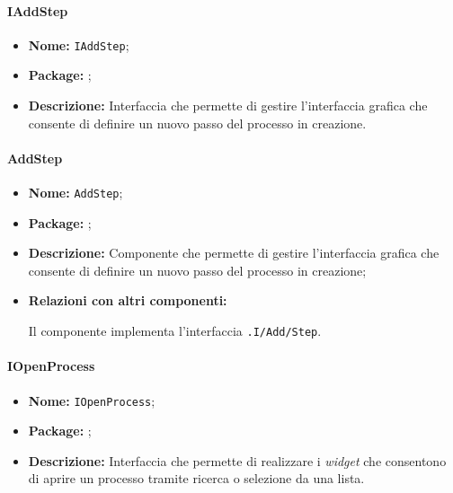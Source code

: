 \paragraph{IAddStep}
\begin{itemize}
\item \textbf{Nome:} \texttt{IAddStep};
\item \textbf{Package:} \texttt{\viewAdmin{}};
\item \textbf{Descrizione:} Interfaccia che permette di gestire l'interfaccia grafica che consente di definire un nuovo passo del processo in creazione.
\end{itemize}

\paragraph{AddStep}
\begin{flushleft}
\begin{itemize}
\item \textbf{Nome:} \texttt{AddStep};
\item \textbf{Package:} \texttt{\viewAdmin{}};
\item \textbf{Descrizione:} Componente che permette di gestire l'interfaccia grafica che consente di definire un nuovo passo del processo in creazione;
\item \textbf{Relazioni con altri componenti:}
\begin{sloppypar}
Il componente implementa l'interfaccia \texttt{\viewAdmin{}.I\fshyp{}Add\fshyp{}Step}.
\end{sloppypar}
\end{itemize}
\end{flushleft}

\paragraph{IOpenProcess}
\begin{itemize}
\item \textbf{Nome:} \texttt{IOpenProcess};
\item \textbf{Package:} \texttt{\viewAdmin{}};
\item \textbf{Descrizione:} Interfaccia che permette di realizzare i \textit{widget} che consentono di aprire un processo tramite ricerca o selezione da una lista.
\end{itemize}

